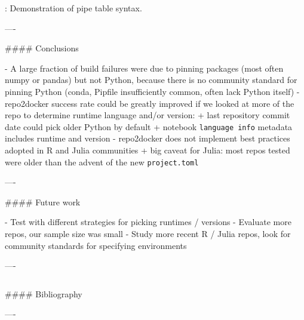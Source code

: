 \documentclass{beamer}
\begin{document}
\begin{frame}[fragile]
\begin{columns}[T]
\begin{column}{.46\textwidth}
\begin{markdown}
  : Demonstration of pipe table syntax.

----

#### Conclusions

- A large fraction of build failures were due to pinning packages (most often numpy or pandas)
  but not Python, because there is no community standard for pinning Python (conda, Pipfile insufficiently common, often lack Python itself)
- repo2docker success rate could be greatly improved if we looked at more of the repo to determine runtime language and/or version:
    + last repository commit date could pick older Python by default
    + notebook \texttt{language info} metadata includes runtime and version
- repo2docker does not implement best practices adopted in R and Julia communities
    + big caveat for Julia: most repos tested were older than the advent of the new \texttt{project.toml}

----

#### Future work

- Test with different strategies for picking runtimes / versions
- Evaluate more repos, our sample size was small
- Study more recent R / Julia repos, look for community standards for specifying environments

----

\end{markdown}
\end{column}
\end{columns}

\begin{markdown}


#### Bibliography




----

\end{markdown}

\end{frame}
\end{document}
